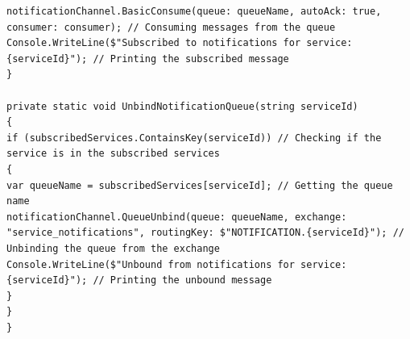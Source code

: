 \documentclass[12pt]{article}
\begin{document}
{\begin{verbatim}
notificationChannel.BasicConsume(queue: queueName, autoAck: true, consumer: consumer); // Consuming messages from the queue
Console.WriteLine($"Subscribed to notifications for service: {serviceId}"); // Printing the subscribed message
}

private static void UnbindNotificationQueue(string serviceId)
{
if (subscribedServices.ContainsKey(serviceId)) // Checking if the service is in the subscribed services
{
var queueName = subscribedServices[serviceId]; // Getting the queue name
notificationChannel.QueueUnbind(queue: queueName, exchange: "service_notifications", routingKey: $"NOTIFICATION.{serviceId}"); // Unbinding the queue from the exchange
Console.WriteLine($"Unbound from notifications for service: {serviceId}"); // Printing the unbound message
}
}
}



\end{verbatim}
}
\end{document}
